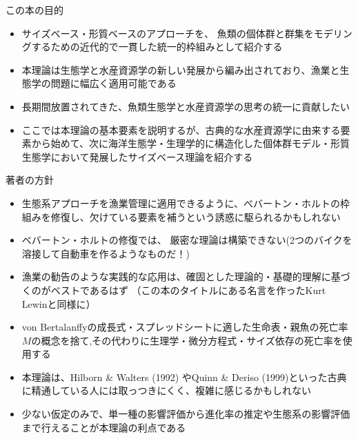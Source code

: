 \documentclass[
  ignorenonframetext,
]{beamer}
\providecommand{\tightlist}{%
  \setlength{\itemsep}{0pt}\setlength{\parskip}{0pt}}
\newcommand{\vspacesmall}{\vspace{3mm}}
\begin{document}
\begin{frame}{この本の目的}
\protect\hypertarget{ux3053ux306eux672cux306eux76eeux7684}{}

\begin{itemize}
\tightlist
\item
  サイズベース・形質ベースのアプローチを、
  魚類の個体群と群集をモデリングするための近代的で一貫した統一的枠組みとして紹介する\\
  \vspacesmall
\item
  本理論は生態学と水産資源学の新しい発展から編み出されており、漁業と生態学の問題に幅広く適用可能である\\
  \vspacesmall
\item
  長期間放置されてきた、魚類生態学と水産資源学の思考の統一に貢献したい\\
  \vspacesmall
\item
  ここでは本理論の基本要素を説明するが、古典的な水産資源学に由来する要素から始めて、次に海洋生態学・生理学的に構造化した個体群モデル・形質生態学において発展したサイズベース理論を紹介する
\end{itemize}

\end{frame}

\begin{frame}{著者の方針}
\protect\hypertarget{ux8457ux8005ux306eux65b9ux91dd}{}

\begin{itemize}
\tightlist
\item
  生態系アプローチを漁業管理に適用できるように、べバートン・ホルトの枠組みを修復し、欠けている要素を補うという誘惑に駆られるかもしれない\\
\item
  べバートン・ホルトの修復では、
  厳密な理論は構築できない(2つのバイクを溶接して自動車を作るようなものだ！)\\
\item
  漁業の勧告のような実践的な応用は、確固とした理論的・基礎的理解に基づくのがベストであるはず
  （この本のタイトルにある名言を作ったKurt Lewinと同様に）\\
\item
  von
  Bertalanffyの成長式・スプレッドシートに適した生命表・親魚の死亡率\(M\)の概念を捨て,その代わりに生理学・微分方程式・サイズ依存の死亡率を使用する\\
\item
  本理論は、Hilborn \& Walters (1992) やQuinn \& Deriso
  (1999)といった古典に精通している人には取っつきにくく、複雑に感じるかもしれない\\
\item
  少ない仮定のみで、単一種の影響評価から進化率の推定や生態系の影響評価まで行えることが本理論の利点である
\end{itemize}

\end{frame}
\end{document}
